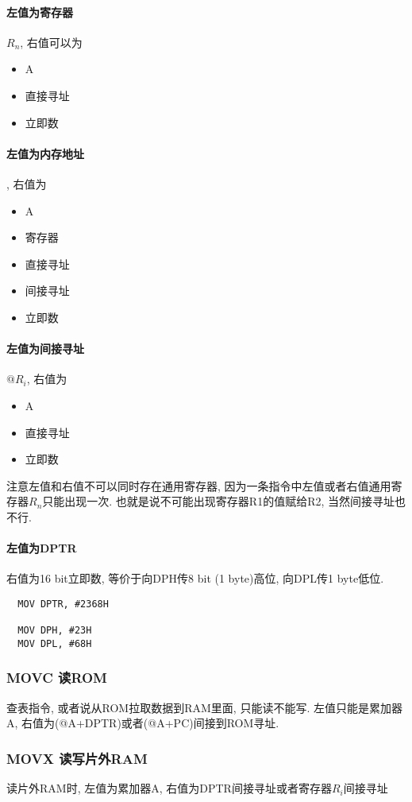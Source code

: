 \documentclass[a4paper]{report}
\begin{document}
\paragraph{左值为寄存器}$R_n$, 右值可以为
\begin{itemize}
  \item A
  \item 直接寻址
  \item 立即数
\end{itemize}
\paragraph{左值为内存地址}, 右值为
\begin{itemize}
  \item A
  \item 寄存器
  \item 直接寻址
  \item 间接寻址
  \item 立即数
\end{itemize}
\paragraph{左值为间接寻址}$@R_i$, 右值为
\begin{itemize}
  \item A
  \item 直接寻址
  \item 立即数
\end{itemize}
注意左值和右值不可以同时存在通用寄存器, 因为一条指令中左值或者右值通用寄存器$R_n$只能出现一次. 也就是说不可能出现寄存器R1的值赋给R2, 当然间接寻址也不行. 
\paragraph{左值为DPTR} 右值为16 bit立即数, 等价于向DPH传8 bit (1 byte)高位, 向DPL传1 byte低位. 
\begin{verbatim}
  MOV DPTR, #2368H

  MOV DPH, #23H
  MOV DPL, #68H
\end{verbatim}
\subsubsection{MOVC 读ROM}
查表指令, 或者说从ROM拉取数据到RAM里面, 只能读不能写. 左值只能是累加器A, 右值为(@A+DPTR)或者(@A+PC)间接到ROM寻址. 
\subsubsection{MOVX 读写片外RAM}
读片外RAM时, 左值为累加器A, 右值为DPTR间接寻址或者寄存器$R_i$间接寻址
\end{document}
